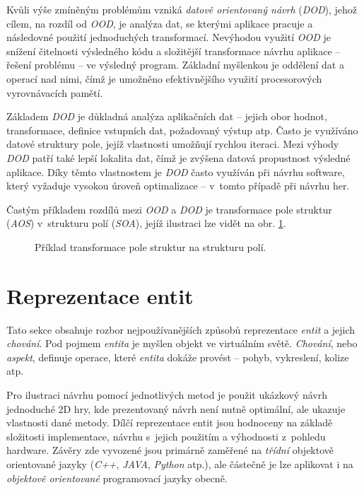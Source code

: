 Kvůli výše zmíněným problémům vzniká \emph{datově orientovaný návrh}\cite{DOD} (\emph{DOD}), jehož cílem, na rozdíl od \emph{OOD}, je analýza dat, se kterými aplikace pracuje a následovné použití jednoduchých transformací. Nevýhodou využití \emph{OOD} je snížení čitelnosti výsledného kódu a složitější transformace návrhu aplikace -- řešení problému -- ve výsledný program. Základní myšlenkou je oddělení dat a operací nad nimi, čímž je umožněno efektivnějšího využití procesorových vyrovnávacích pamětí.

Základem \emph{DOD} je důkladná analýza aplikačních dat -- jejich obor hodnot, transformace, definice vstupních dat, požadovaný výstup atp. Často je využíváno datové struktury pole, jejíž vlastnosti umožňují rychlou iteraci. Mezi výhody \emph{DOD} patří také lepší lokalita dat, čímž je zvýšena datová propustnost výsledné aplikace. Díky těmto vlastnostem je \emph{DOD} často využíván při návrhu software, který vyžaduje vysokou úroveň optimalizace -- v~tomto případě při návrhu her\cite{DataOrientedDesignDice, DataOrientedDesignCppCon}.

Častým příkladem rozdílů mezi \emph{OOD} a \emph{DOD} je transformace pole struktur (\emph{AOS}) v~strukturu polí (\emph{SOA}), jejíž ilustraci lze vidět na obr. \ref{Fig:SOAASO}.

\begin{figure}[]
	\centering
	\caption{Příklad transformace pole struktur na strukturu polí.}
	\label{Fig:SOAASO}
\end{figure}


\section{Reprezentace entit}
\label{Chap:Representation}

Tato sekce obsahuje rozbor nejpoužívanějších způsobů reprezentace \emph{entit} \cite{EvolveHierarchy} a jejich \emph{chování}. Pod pojmem \emph{entita} je myšlen objekt ve virtuálním světě. \emph{Chování}, nebo \emph{aspekt}, definuje operace, které \emph{entita} dokáže provést -- pohyb, vykreslení, kolize atp.

Pro ilustraci návrhu pomocí jednotlivých metod je použit ukázkový návrh jednoduché 2D  hry, kde prezentovaný návrh není nutně optimální, ale ukazuje vlastnosti dané metody. Dílčí reprezentace entit jsou hodnoceny na základě složitosti implementace, návrhu s~jejich použitím a výhodnosti z~pohledu hardware. Závěry zde vyvozené jsou primárně zaměřené na \emph{třídní} objektově orientované jazyky (\emph{C++}, \emph{JAVA}, \emph{Python} atp.), ale částečně je lze aplikovat i na \emph{objektově orientované} programovací jazyky obecně.

